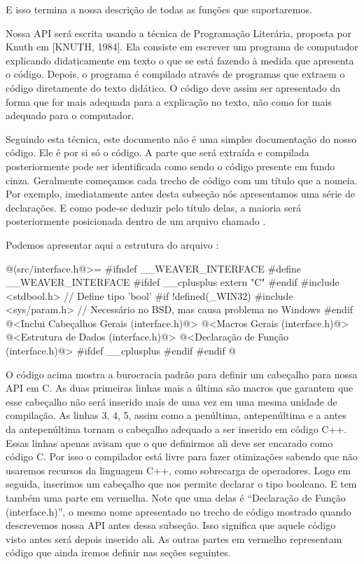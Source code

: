 E isso termina a nossa descrição de todas as funções que suportaremos.


Nossa API será escrita usando a técnica de Programação Literária,
proposta por Knuth em [KNUTH, 1984]. Ela consiste em escrever um
programa de computador explicando didaticamente em texto o que se está
fazendo à medida que apresenta o código. Depois, o programa é
compilado através de programas que extraem o código diretamente do
texto didático. O código deve assim ser apresentado da forma que for
mais adequada para a explicação no texto, não como for mais adequado
para o computador.

Seguindo esta técnica, este documento não é uma simples documentação
do nosso código. Ele é por si só o código. A parte que será extraída e
compilada posteriormente pode ser identificada como sendo o código
presente em fundo cinza. Geralmente começamos cada trecho de código
com um título que a nomeia. Por exemplo, imediatamente antes desta
subseção nós apresentamos uma série de declarações. E como pode-se
deduzir pelo título delas, a maioria será posteriormente posicionada
dentro de um arquivo chamado .

Podemos apresentar aqui a estrutura do arquivo
:

\iniciocodigo
@(src/interface.h@>=
#ifndef __WEAVER_INTERFACE
#define __WEAVER_INTERFACE
#ifdef __cplusplus
extern "C" {
#endif
#include <stdbool.h> // Define tipo 'bool'
#if !defined(_WIN32)
#include <sys/param.h> // Necessário no BSD, mas causa problema no Windows
#endif
@<Inclui Cabeçalhos Gerais (interface.h)@>
@<Macros Gerais (interface.h)@>
@<Estrutura de Dados (interface.h)@>
@<Declaração de Função (interface.h)@>
#ifdef __cplusplus
}
#endif
#endif
@
\fimcodigo

O código acima mostra a burocracia padrão para definir um cabeçalho
para nossa API em C. As duas primeiras linhas mais a última são macros
que garantem que esse cabeçalho não será inserido mais de uma vez em
uma mesma unidade de compilação. As linhas 3, 4, 5, assim como a
penúltima, antepenúltima e a antes da antepenúltima tornam o cabeçalho
adequado a ser inserido em código C++. Essas linhas apenas avisam que
o que definirmos ali deve ser encarado como código C. Por isso o
compilador está livre para fazer otimizações sabendo que não usaremos
recursos da linguagem C++, como sobrecarga de operadores. Logo em
seguida, inserimos um cabeçalho que nos permite declarar o tipo
booleano. E tem também uma parte em vermelha. Note que uma delas é
``Declaração de Função (interface.h)'', o mesmo nome apresentado no trecho de
código mostrado quando descrevemos nossa API antes dessa
subseção. Isso significa que aquele código visto antes será depois
inserido ali. As outras partes em vermelho representam código que
ainda iremos definir nas seções seguintes.

